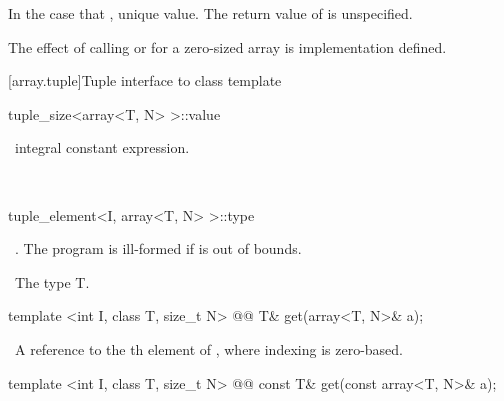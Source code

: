 \documentclass[american,twoside]{book}
\begin{document}
\pnum In the case that ,  unique value.
The return value of  is unspecified.

\pnum
The effect of calling  or  for a zero-sized array
is implementation defined.

[array.tuple]{Tuple interface to class template }
%
%
%
%

%
\begin{itemdecl}
tuple_size<array<T, N> >::value
\end{itemdecl}

\begin{itemdescr}
\pnum
\returntype\   integral constant expression.

\pnum
\cvalue\  
\end{itemdescr}

%
\begin{itemdecl}
tuple_element<I, array<T, N> >::type
\end{itemdecl}

\begin{itemdescr}
\pnum
\requires\  .   The program is ill-formed if  is out of bounds.

\pnum
\cvalue\  The type T.
\end{itemdescr}

%
%
\begin{itemdecl}
template <int I, class T, size_t N> 
  @@
  T& get(array<T, N>& a); 
\end{itemdecl}

\begin{itemdescr}
\pnum
{}

\returns\  A reference to the th element of , 
where indexing is zero-based.
\end{itemdescr}

%
%
\begin{itemdecl}
template <int I, class T, size_t N> 
  @@
  const T& get(const array<T, N>& a); 
\end{itemdecl}
\end{document}
